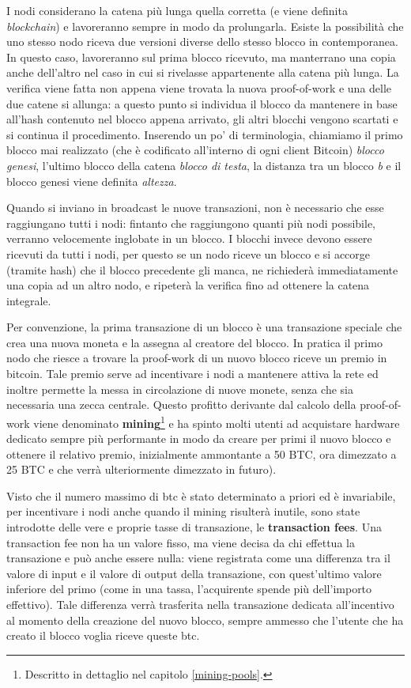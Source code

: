 I nodi considerano la catena più lunga quella corretta (e viene definita \emph{blockchain}) e lavoreranno sempre in modo da prolungarla. Esiste la possibilità che uno stesso nodo riceva due versioni diverse dello stesso blocco in contemporanea. In questo caso, lavoreranno sul prima blocco ricevuto, ma manterrano una copia anche dell'altro nel caso in cui si rivelasse appartenente alla catena più lunga. La verifica viene fatta non appena viene trovata la nuova proof-of-work e una delle due catene si allunga: a questo punto si individua il blocco da mantenere in base all'hash contenuto nel blocco appena arrivato, gli altri blocchi vengono scartati e si continua il procedimento. Inserendo un po' di terminologia, chiamiamo il primo blocco mai realizzato (che è codificato all'interno di ogni client Bitcoin) \emph{blocco genesi}, l'ultimo blocco della catena \emph{blocco di testa}, la distanza tra un blocco \emph{b} e il blocco genesi viene definita \emph{altezza}.

Quando si inviano in broadcast le nuove transazioni, non è necessario che esse raggiungano tutti i nodi: fintanto che raggiungono quanti più nodi possibile, verranno velocemente inglobate in un blocco. I blocchi invece devono essere ricevuti da tutti i nodi, per questo se un nodo riceve un blocco e si accorge (tramite hash) che il blocco precedente gli manca, ne richiederà immediatamente una copia ad un altro nodo, e ripeterà la verifica fino ad ottenere la catena integrale.

Per convenzione, la prima transazione di un blocco è una transazione speciale che crea una nuova moneta e la assegna al creatore del blocco. In pratica il primo nodo che riesce a trovare la proof-work di un nuovo blocco riceve un premio in bitcoin. Tale premio serve ad incentivare i nodi a mantenere attiva la rete ed inoltre permette la messa in circolazione di nuove monete, senza che sia necessaria una zecca centrale. Questo profitto derivante dal calcolo della proof-of-work viene denominato \textbf{mining}\footnote{Descritto in dettaglio nel capitolo \ref{mining-pools}.} e ha spinto molti utenti ad acquistare hardware dedicato sempre più performante in modo da creare per primi il nuovo blocco e ottenere il relativo premio, inizialmente ammontante a 50 BTC, ora dimezzato a 25 BTC e che verrà ulteriormente dimezzato in futuro).

Visto che il numero massimo di btc è stato determinato a priori ed è invariabile, per incentivare i nodi anche quando il mining risulterà inutile, sono state introdotte delle vere e proprie tasse di transazione, le \textbf{transaction fees}. Una transaction fee non ha un valore fisso, ma viene decisa da chi effettua la transazione e può anche essere nulla: viene registrata come una differenza tra il valore di input e il valore di output della transazione, con quest'ultimo valore inferiore del primo (come in una tassa, l'acquirente spende più dell'importo effettivo). Tale differenza verrà trasferita nella transazione dedicata all'incentivo al momento della creazione del nuovo blocco, sempre ammesso che l'utente che ha creato il blocco voglia riceve queste btc.


